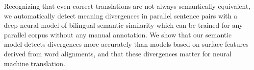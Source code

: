 Recognizing that even correct translations are not always semantically equivalent, we automatically detect meaning divergences in parallel sentence pairs with a deep neural model of bilingual semantic similarity which can be trained for any parallel corpus without any  manual annotation. We show that our semantic model detects divergences more accurately than models based on surface features derived from word alignments, and that these divergences matter for neural machine translation.
